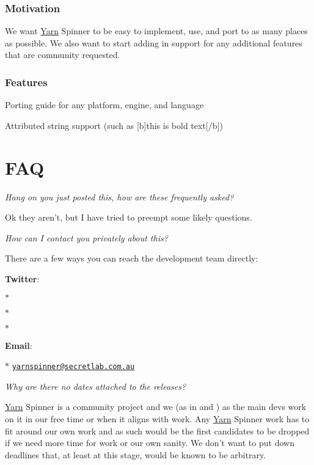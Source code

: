 \subsubsection*{Motivation}

We want \hyperlink{a00050}{Yarn} Spinner to be easy to implement, use, and port to as many places as possible. We also want to start adding in support for any additional features that are community requested.

\subsubsection*{Features}


\begin{DoxyItemize}
\item Porting guide for any platform, engine, and language
\item Attributed string support (such as {\ttfamily \mbox{[}b\mbox{]}this is bold text\mbox{[}/b\mbox{]}})
\end{DoxyItemize}

\section*{F\-A\-Q}

{\itshape Hang on you just posted this, how are these frequently asked?}

Ok they aren't, but I have tried to preempt some likely questions.

{\itshape How can I contact you privately about this?}

There are a few ways you can reach the development team directly\-:


\begin{DoxyItemize}
\item {\bfseries Twitter}\-:
\item $\ast$ \href{https://twitter.com/YarnSpinnerTool}{\tt }
\item $\ast$ \href{https://twitter.com/desplesda}{\tt }
\item $\ast$ \href{https://twitter.com/The_McJones}{\tt }
\item {\bfseries Email}\-:
\item $\ast$ \href{mailto:yarnspinner@secretlab.com.au}{\tt yarnspinner@secretlab.\-com.\-au}
\end{DoxyItemize}

{\itshape Why are there no dates attached to the releases?}

\hyperlink{a00050}{Yarn} Spinner is a community project and we (as in  and ) as the main devs work on it in our free time or when it aligns with work. Any \hyperlink{a00050}{Yarn} Spinner work has to fit around our own work and as such would be the first candidates to be dropped if we need more time for work or our own sanity. We don't want to put down deadlines that, at least at this stage, would be known to be arbitrary.

